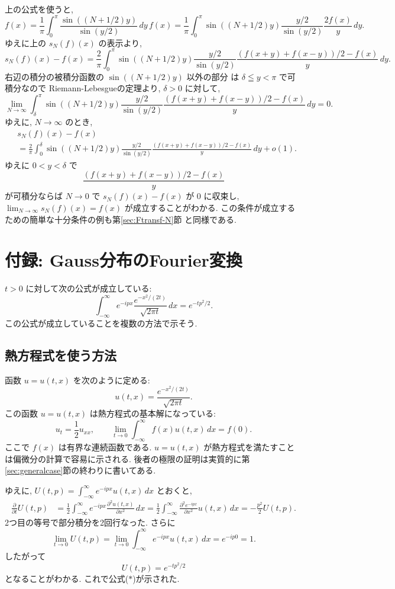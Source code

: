 \documentclass[12pt,twoside]{jarticle}
\renewcommand\d{\partial}
\theoremstyle{jplain}
\theoremstyle{jplain}
\theoremstyle{jplain}
\numberwithin{theorem}{section}
\numberwithin{equation}{section}
\numberwithin{figure}{section}
\numberwithin{table}{section}
\newcommand\secref[1]{第\ref{#1}節}
\begin{document}
上の公式を使うと,
\[
f(x)
=\frac{1}{\pi}\int_0^{\pi}\frac{\sin((N+1/2)y)}{\sin(y/2)}\,dy\,f(x)
=\frac{1}{\pi}\int_0^{\pi}\sin((N+1/2)y)\frac{y/2}{\sin(y/2)}\frac{2f(x)}{y}\,dy.
\]
ゆえに上の $s_N(f)(x)$ の表示より,
\[
s_N(f)(x)-f(x)
=\frac{2}{\pi}\int_0^\pi
\sin((N+1/2)y)
\frac{y/2}{\sin(y/2)}\frac{(f(x+y)+f(x-y))/2-f(x)}{y}\,dy.
\]
右辺の積分の被積分函数の $\sin((N+1/2)y)$ 以外の部分
は $\delta\leqq y<\pi$ で可積分なので
Riemann-Lebesgueの定理より, $\delta>0$ に対して,
\[
\lim_{N\to\infty}
\int_\delta^\pi
\sin((N+1/2)y)
\frac{y/2}{\sin(y/2)}\frac{(f(x+y)+f(x-y))/2-f(x)}{y}\,dy=0.
\]
ゆえに, $N\to\infty$ のとき,
\begin{align*}
&
s_N(f)(x)-f(x)
\\ &
=\frac{2}{\pi}\int_0^\delta
\sin((N+1/2)y)
\frac{y/2}{\sin(y/2)}\frac{(f(x+y)+f(x-y))/2-f(x)}{y}\,dy + o(1).
\end{align*}
ゆえに $0<y<\delta$ で
\[
\frac{(f(x+y)+f(x-y))/2-f(x)}{y}
\]
が可積分ならば $N\to 0$ で $s_N(f)(x)-f(x)$ が $0$ に収束し,
$\lim_{N\to\infty}s_N(f)(x)=f(x)$ が成立することがわかる.
この条件が成立するための簡単な十分条件の例も\secref{sec:Ftransf-N}
と同様である.


\section{付録: Gauss分布のFourier変換}
\label{sec:Gauss-Fourier}

$t>0$ に対して次の公式が成立している:
\[
\int_{-\infty}^\infty e^{-ipx} \frac{e^{-x^2/(2t)}}{\sqrt{2\pi t}}\,dx
= e^{-tp^2/2}.
\tag{$*$}
\]
この公式が成立していることを複数の方法で示そう.

\subsection{熱方程式を使う方法}

函数 $u=u(t,x)$ を次のように定める:
\[
u(t,x)
= \frac{e^{-x^2/(2t)}}{\sqrt{2\pi t}}.
\]
この函数 $u=u(t,x)$ は熱方程式の基本解になっている:
\[
u_t = \frac{1}{2}u_{xx}, \qquad
\lim_{t\to 0}\int_{-\infty}^\infty f(x) u(t,x)\,dx=f(0).
\]
ここで $f(x)$ は有界な連続函数である.
$u=u(t,x)$ が熱方程式を満たすことは偏微分の計算で容易に示される.
後者の極限の証明は実質的に\secref{sec:generalcase}の終わりに書いてある.

ゆえに, $U(t,p)=\int_{-\infty}^\infty e^{-ipx} u(t,x)\,dx$ とおくと,
\begin{align*}
\frac{\d}{\d t}U(t,p)
&=
\frac{1}{2}
\int_{-\infty}^\infty e^{-ipx} \frac{\d^2 u(t,x)}{\d x^2}\,dx
=
\frac{1}{2}
\int_{-\infty}^\infty \frac{\d^2 e^{-ipx}}{\d x^2}  u(t,x)\,dx
=
-\frac{p^2}{2}U(t,p).
\end{align*}
2つ目の等号で部分積分を2回行なった. さらに
\[
\lim_{t\to 0}U(t,p)
=\lim_{t\to 0} \int_{-\infty}^\infty e^{-ipx} u(t,x)\,dx
=e^{-ip0}
=1.
\]
したがって
\[
U(t,p)=e^{-tp^2/2}
\]
となることがわかる. これで公式($*$)が示された.
\end{document}
